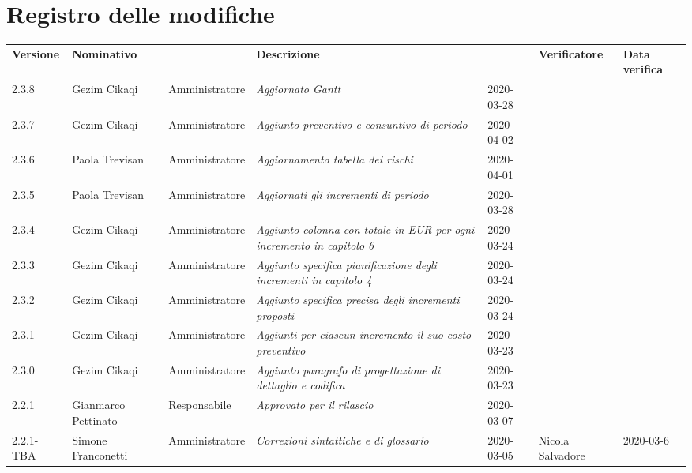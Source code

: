 \section*{Registro delle modifiche}
\renewcommand{\arraystretch}{1.8}
  \setlength\LTleft{-1.7cm}
  \begin{longtable}{|p{1.7cm}|p{2cm}|p{2.5cm}|p{3cm}|p{1.7cm}|p{2cm}|p{2.3cm}|}
    \hline
    \rowcolor{header}
    \textbf{Versione} & \textbf{Nominativo} & \centering{\textbf{Ruolo}} & \textbf{Descrizione} &      \centering{\textbf{Data}} & \textbf{Verificatore} & \textbf{Data verifica} \\
    
    2.3.8 & Gezim Cikaqi & Amministratore & \small{\textit{Aggiornato Gantt}} & 2020-03-28 & &\\
    2.3.7 & Gezim Cikaqi & Amministratore & \small{\textit{Aggiunto preventivo e consuntivo di periodo}} & 2020-04-02 & &\\
    2.3.6 & Paola Trevisan & Amministratore & \small{\textit{Aggiornamento tabella dei rischi}} & 2020-04-01 & &\\
    2.3.5 & Paola Trevisan & Amministratore & \small{\textit{Aggiornati gli incrementi di periodo}} & 2020-03-28 & &\\
    2.3.4 & Gezim Cikaqi & Amministratore & \small{\textit{Aggiunto colonna con totale in EUR per ogni incremento in capitolo 6}} & 2020-03-24 & &\\
    2.3.3 & Gezim Cikaqi & Amministratore & \small{\textit{Aggiunto specifica pianificazione degli incrementi in capitolo 4}} & 2020-03-24 & &\\
    2.3.2 & Gezim Cikaqi & Amministratore & \small{\textit{Aggiunto specifica precisa degli incrementi proposti}} & 2020-03-24 & &\\
    2.3.1 & Gezim Cikaqi & Amministratore & \small{\textit{Aggiunti per ciascun incremento il suo costo preventivo}} & 2020-03-23 & &\\
    2.3.0 & Gezim Cikaqi & Amministratore & \small{\textit{Aggiunto paragrafo di progettazione di dettaglio e codifica}} & 2020-03-23 & &\\
    2.2.1 & Gianmarco Pettinato & Responsabile & \small{\textit{Approvato per il rilascio}} & 2020-03-07 & &\\
    2.2.1-TBA & Simone Franconetti & Amministratore & \small{\textit{Correzioni sintattiche e di glossario}} & 2020-03-05 & Nicola Salvadore & 2020-03-6 \\

\end{longtable}
